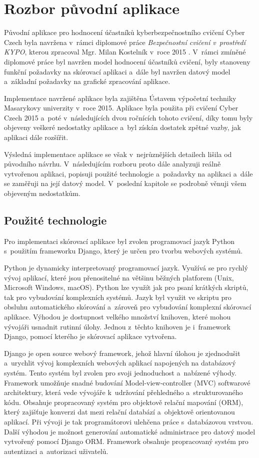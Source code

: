 \documentclass[
  digital,
  twoside,
  table, 
  nolof, 
  nolot
]{fithesis3}
\begin{document}
\chapter{Rozbor původní aplikace}
\label{oldApp}

Původní aplikace pro hodnocení účastníků kyberbezpečnostního cvičení Cyber Czech byla navržena v~rámci diplomové práce \emph{Bezpečnostní cvičení v~prostředí KYPO}, kterou zpracoval Mgr. Milan Kostelník v~roce 2015 \cite{Kostelnik2016thesis}. V~rámci zmíněné diplomové práce byl navržen model hodnocení účastníků cvičení, byly stanoveny funkční požadavky na skórovací aplikaci a~dále byl navržen datový model a~základní požadavky na grafické zpracování aplikace. 

Implementace navržené aplikace byla zajištěna Ústavem výpočetní techniky Masarykovy univerzity v~roce 2015. Aplikace byla použita při cvičení Cyber Czech 2015 a~poté v~následujících dvou ročnících tohoto cvičení, díky tomu byly objeveny veškeré nedostatky aplikace a~byl získán dostatek zpětné vazby, jak aplikaci dále rozšířit.

Výsledná implementace aplikace se však v~nejrůznějších detailech lišila od původního návrhu. V~následujícím rozboru proto dále analyzuji reálně vytvořenou aplikaci, popisuji použité technologie a~požadavky na aplikaci a~dále se zaměřuji na její datový model. V~poslední kapitole se podrobně věnuji všem objeveným nedostatkům.

\section{Použité technologie}
Pro implementaci skórovací aplikace byl zvolen programovací jazyk Python s~použitím frameworku Django, který je určen pro tvorbu webových systémů. 

Python je dynamicky interpretovaný programovací jazyk. Využívá se pro rychlý vývoj aplikací, které jsou přenositelné na většinu běžných platforem (Unix, Microsoft Windows, macOS). Python lze využít jak pro psaní krátkých skriptů, tak pro vybudování komplexních systémů. Jazyk byl využit ve skriptu pro obsluhu automatického skórování a~zároveň pro vybudování komplexní skórovací aplikace. Výhodou je dostupnost velkého množství knihoven, které mohou vývojáři usnadnit rutinní úlohy. Jednou z~těchto knihoven je i~framework Django, pomocí kterého je skórovací aplikace vytvořena.

Django je open source webový framework, jehož hlavní úlohou je zjednodušit a~urychlit vývoj komplexních webových aplikací napojených na databázový systém. Tento systém byl zvolen pro svoji jednoduchost a~nabízené výhody. Framework umožňuje snadné budování Model-view-controller (MVC) softwarové architektury, která vede vývojáře k~udržování přehledného a~strukturovaného kódu. Obsahuje propracovaný systém pro objektově relační mapování (ORM), který zajišťuje konverzi dat mezi relační databází a~objektově orientovanou aplikací. Při vývoji je tak programátorovi ulehčena práce s~databázovou vrstvou. Další výhodou je možnost generování automatické administrace pro datový model vytvořený pomocí Django ORM. Framework obsahuje propracovaný systém pro autentizaci a~autorizaci uživatelů. 
\end{document}
